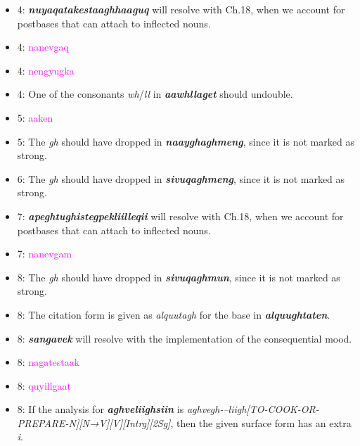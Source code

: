 \documentclass{article}
\begin{document}
\begin{itemize}
\renewcommand\labelitemi{$\cdot$}

\item 4: \textit{\textbf{nuyaqatakestaaghhaaguq}} will resolve with Ch.18, when we account for postbases that can attach to inflected nouns.

\item 4: \textcolor{magenta}{nanevgaq}

\item 4: \textcolor{magenta}{nengyugka} 

\item 4: One of the consonants \textit{wh}/\textit{ll} in {\textit{\textbf{aawhllaget}}} should undouble.

\item 5: \textcolor{magenta}{aaken} 

\item 5: The \textit{gh} should have dropped in \textit{\textbf{naayghaghmeng}}, since it is not marked as strong.

\item 6: The \textit{gh} should have dropped in \textit{\textbf{sivuqaghmeng}}, since it is not marked as strong.

\item 7: \textit{\textbf{apeghtughistegpekliilleqii}} will resolve with Ch.18, when we account for postbases that can attach to inflected nouns.

\item 7: \textcolor{magenta}{nanevgam}

\item 8: The \textit{gh} should have dropped in \textit{\textbf{sivuqaghmun}}, since it is not marked as strong.

\item 8: The citation form is given as \textit{alquutagh} for the base in \textit{\textbf{alquughtaten}}. 

\item 8: \textit{\textbf{sangavek}} will resolve with the implementation of the consequential mood. 

\item 8: \textcolor{magenta}{nagatestaak}

\item 8: \textcolor{magenta}{quyillgaat}

\item 8: If the analysis for \textit{\textbf{aghveliighsiin}} is \textit{aghvegh-–liigh[TO-COOK-OR-PREPARE-N][N→V][V][Intrg][2Sg]}, then the given surface form has an extra \textit{i}.


\end{itemize}
\end{document}
